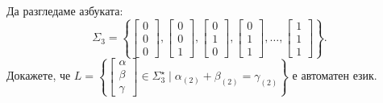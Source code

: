 \begin{problem}
  Да разгледаме азбуката:
  \[\Sigma_3 = \left\{\begin{bmatrix} 0\\0\\0\end{bmatrix},\begin{bmatrix} 0\\0\\1\end{bmatrix},\begin{bmatrix} 0\\1\\0\end{bmatrix},\begin{bmatrix} 0\\1\\1\end{bmatrix},\dots,\begin{bmatrix} 1\\1\\1\end{bmatrix}\right\}.\]
  Докажете, че 
  $L = \left\{\begin{bmatrix} \alpha\\\beta\\\gamma\end{bmatrix} \in \Sigma^\star_3 \mid \alpha_{(2)}+\beta_{(2)} = \gamma_{(2)}\right\}$
  е автоматен език.
\end{problem}

